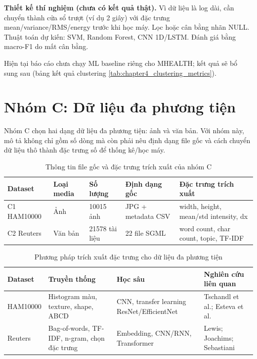 \textbf{Thiết kế thí nghiệm (chưa có kết quả thật).} Vì dữ liệu là log dài, cần chuyển thành cửa sổ trượt (ví dụ 2 giây) với đặc trưng mean/variance/RMS/energy trước khi học máy. Lọc hoặc cân bằng nhãn NULL. Thuật toán dự kiến: SVM, Random Forest, CNN 1D/LSTM. Đánh giá bằng macro-F1 do mất cân bằng.

Hiện tại báo cáo chưa chạy ML baseline riêng cho MHEALTH; kết quả sẽ bổ sung sau (bảng kết quả clustering \ref{tab:chapter4_clustering_metrics}).


\section{Nhóm C: Dữ liệu đa phương tiện}

Nhóm C chọn hai dạng dữ liệu đa phương tiện: ảnh và văn bản. Với nhóm này, mô tả không chỉ gồm số dòng mà còn phải nêu định dạng file gốc và cách chuyển dữ liệu thô thành đặc trưng số để thống kê/học máy.

\begin{table}[H]
\centering
\caption{Thông tin file gốc và đặc trưng trích xuất của nhóm C}
\label{tab:group_c_file_format_summary}
\small
\begin{tabular}{p{}p{}p{}p{}p{}}
\toprule
Dataset & Loại media & Số lượng & Định dạng gốc & Đặc trưng trích xuất \\
\midrule
C1 HAM10000 & Ảnh & 10015 ảnh & JPG + metadata CSV & width, height, mean/std intensity, dx \\
C2 Reuters & Văn bản & 21578 tài liệu & 22 file SGML & word count, char count, topic, TF-IDF \\
\bottomrule
\end{tabular}
\end{table}

\begin{table}[H]
\centering
\caption{Phương pháp trích xuất đặc trưng cho dữ liệu đa phương tiện}
\label{tab:group_c_feature_extraction_methods}
\small
\begin{tabular}{p{}p{}p{}p{}}
\toprule
Dataset & Truyền thống & Học sâu & Nghiên cứu liên quan \\
\midrule
HAM10000 & Histogram màu, texture, shape, ABCD & CNN, transfer learning ResNet/EfficientNet & Tschandl et al.; Esteva et al. \\
Reuters & Bag-of-words, TF-IDF, n-gram, chọn đặc trưng & Embedding, CNN/RNN, Transformer & Lewis; Joachims; Sebastiani \\
\bottomrule
\end{tabular}
\end{table}

